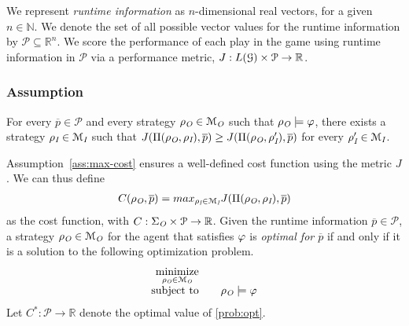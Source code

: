 We represent \emph{runtime information} as $n$-dimensional real vectors, for a given $n \in \mathbb N$. We denote the set of all possible vector values for the runtime information by $\mathcal{P}\subseteq \mathbb{R}^n$. We score the performance of each play in the game using runtime information in $\mathcal{P}$ via a performance metric, $J: L(\mathcal{G})\times\mathcal{P} \to \mathbb{R}$. 




\subsubsection*{Assumption}
For every $\overline p \in \mathcal{P}$ and every strategy $\rho_{\textit{O}}\in\mathcal{M}_{\textit{O}}$ such that $\rho_{\textit{O}}\models\varphi$, there exists a strategy $\rho_{\textit{I}} \in\mathcal{M}_{\textit{I}}$ such that $  J(\Pi(\rho_{\textit{O}},\rho_{\textit{I}}), \overline p) \geq J(\Pi(\rho_{\textit{O}},\rho_{\textit{I}}'), \overline p)$ for every $\rho_{\textit{I}}'\in\mathcal{M}_{\textit{I}}$. 

Assumption~\ref{ass:max-cost} ensures a well-defined cost function using the metric $J$. We can thus define
\begin{align}
C(\rho_{\textit{O}},\overline{p}) = max_{\rho_{\textit{I}} \in\mathcal{M}_{\textit{I}}}J(\Pi(\rho_{\textit{O}},\rho_{\textit{I}}), \overline p)
\end{align}
as the cost function, with $C:\Sigma_{\textit{O}} \times \mathcal{P} \to \mathbb{R}$.
Given the runtime information $\overline p \in \mathcal P$, a strategy $\rho_{\textit{O}} \in \mathcal M_{\textit{O}}$ for the agent that satisfies $\varphi$ is \emph{optimal for $\overline p$} if and only if it is a solution to the following optimization problem.
\begin{align}
    \begin{array}{rl}
        \underset{\rho_\out\in
        \mathcal{M}_\out}{\mathrm{minimize}}&\quad
        \ \\
        \mathrm{subject\ to}&\quad \rho_\out\models \varphi
    \end{array}\label{prob:opt}%
\end{align}
Let $C^\ast: \mathcal{P} \to \mathbb{R}$ denote the optimal value of \eqref{prob:opt}.

